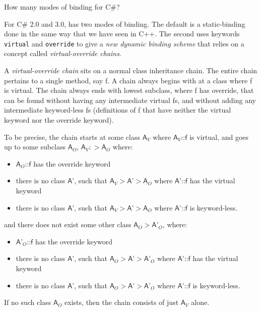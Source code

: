 \begin{example}
How many modes of binding for C\#? 

For C\# 2.0 and 3.0, has two modes of binding. 
The default is a static-binding done in the same way that we have seen in C++. 
The second uses keywords \lstinline{virtual} and \lstinline{override} 
to give a \textit{new dynamic binding scheme} that relies on a concept called 
\textit{virtual-override chains}. 

A \textit{virtual-override chain} sits on a normal class inheritance chain.
The entire chain pertains to a single method, say \textsf{f}. 
A chain always begins with at a class where \textsf{f} is virtual. 
The chain always ends with lowest subclass, where \textsf{f} has override,
that can be found without having any intermediate virtual \textsf{f}s,
and without adding any intermediate keyword-less \textsf{f}s 
(definitions of \textsf{f} that 
have neither the virtual keyword nor the override keyword).

To be precise, the chain starts at some class $\textsf{A}_V$  
where $\textsf{A}_V\textsf{::f}$ is virtual, and 
goes up to some subclass $\textsf{A}_O$, $\textsf{A}_V :> \textsf{A}_O$ where:
\begin{itemize}[nosep]
\item $\textsf{A}_O\textsf{::f}$ has the override keyword
\item there is no class $\textsf{A'}$, such that 
$\textsf{A}_V > \textsf{A'} > \textsf{A}_O$ where $\textsf{A'::f}$ has the virtual keyword
\item there is no class $\textsf{A'}$, 
such that $\textsf{A}_V > \textsf{A'} > \textsf{A}_O$ 
where $\textsf{A'::f}$ is keyword-less. 
\end{itemize} 

and there does not exist some other class $\textsf{A}_O > \textsf{A'}_O$, where:
\begin{itemize}[nosep]
\item $\textsf{A'}_O\textsf{::f}$ has the override keyword
\item there is no class $\textsf{A'}$, such that 
$\textsf{A}_O > \textsf{A'} > \textsf{A'}_O$ where $\textsf{A'::f}$ has the virtual keyword
\item there is no class $\textsf{A'}$, 
such that $\textsf{A}_O > \textsf{A'} > \textsf{A'}_O$ 
where $\textsf{A'::f}$ is keyword-less. 
\end{itemize}

If no such class $\textsf{A}_O$ exists, then the chain consists of just $\textsf{A}_V$ alone.

\frmrule





\end{example}

